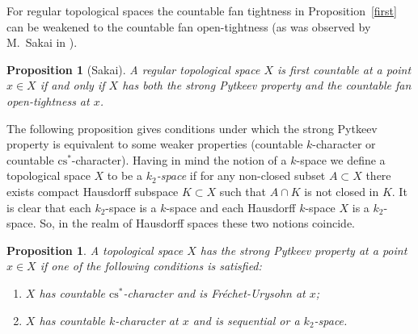 \documentclass{amsart}
\newtheorem{proposition}[theorem]{Proposition}
\theoremstyle{definition}
\begin{document}
For regular topological spaces the countable fan tightness in Proposition~\ref{first} can be weakened to the countable fan open-tightness (as was observed by  M.~Sakai in \cite[3.2]{MSak2}).

\begin{proposition}[Sakai]\label{first:sak} A regular topological space $X$ is first countable at a point $x\in X$ if and only if $X$ has both the strong Pytkeev property and the countable fan open-tightness at $x$.
\end{proposition}

The following proposition gives conditions under which the strong Pytkeev property is equivalent to some weaker properties (countable $k$-character or countable ${\mathrm{cs}}^*$-character). Having in mind the notion of a $k$-space we define a topological space $X$ to be a {\em $k_2$-space} if for any non-closed subset $A\subset X$ there exists compact Hausdorff subspace $K\subset X$ such that $A\cap K$ is not closed in $K$. It is clear that each $k_2$-space is a $k$-space and each Hausdorff $k$-space $X$ is a $k_2$-space. So, in the realm of Hausdorff spaces these two notions coincide.

\begin{proposition} A topological space $X$ has the strong Pytkeev property at a point $x\in X$ if one of the following conditions is satisfied:
\begin{enumerate}
\item $X$ has countable ${\mathrm{cs}}^*$-character and is Fr\'echet-Urysohn at $x$;
\item $X$ has countable $k$-character at $x$ and is sequential or a $k_2$-space.
\end{enumerate}
\end{proposition}
\end{document}
